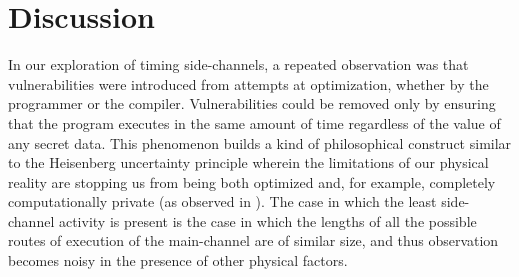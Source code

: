 \section{Discussion}

In our exploration of timing side-channels, a repeated observation was that vulnerabilities were introduced from attempts at optimization, whether by the programmer or the compiler. Vulnerabilities could be removed only by ensuring that the program executes in the same amount of time regardless of the value of any secret data. 
This phenomenon builds a kind of philosophical construct similar to the Heisenberg
uncertainty principle wherein the limitations of our physical reality are stopping
us from being both optimized and, for example, 
completely computationally private (as observed in \cite{oberg2014leveraging}). The
case in which the least side-channel activity is present is the case in which the 
lengths of all the possible routes of execution of the main-channel are of similar
size, and thus observation becomes noisy in the presence of other physical factors.


